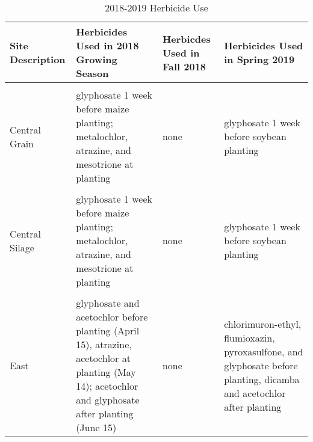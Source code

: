 \documentclass[
]{article}
\begin{document}
\newpage

\begin{table}[H]

\caption{\label{tab:herbtable}2018-2019 Herbicide Use}
\centering
\begin{tabular}[t]{>{\centering\arraybackslash}p{8em}>{\centering\arraybackslash}p{8em}>{\centering\arraybackslash}p{8em}>{\centering\arraybackslash}p{8em}}
\toprule
Site Description & Herbicides Used in 2018 Growing Season & Herbicdes Used in Fall 2018 & Herbicides Used in Spring 2019\\
\midrule
\cellcolor{gray!6}{Central Grain} & \cellcolor{gray!6}{glyphosate 1 week before soybean planting} & \cellcolor{gray!6}{none} & \cellcolor{gray!6}{glyphosate 1 week before maize planting; metalochlor, atrazine, and mesotrione at planting}\\
\cmidrule{1-4}
Central Grain & glyphosate 1 week before maize planting; metalochlor, atrazine, and mesotrione at planting & none & glyphosate 1 week before soybean planting\\
\cmidrule{1-4}
\cellcolor{gray!6}{Central Silage} & \cellcolor{gray!6}{glyphosate 1 week before soybean planting} & \cellcolor{gray!6}{none} & \cellcolor{gray!6}{glyphosate 1 week before maize planting; metalochlor, atrazine, and mesotrione at planting}\\
\cmidrule{1-4}
Central Silage & glyphosate 1 week before maize planting; metalochlor, atrazine, and mesotrione at planting & none & glyphosate 1 week before soybean planting\\
\cmidrule{1-4}
\cellcolor{gray!6}{West} & \cellcolor{gray!6}{glyphosate before planting; glyphosate and fluthiacet-methyl at planting} & \cellcolor{gray!6}{none} & \cellcolor{gray!6}{glyphosate before planting; glyphosate and fluthiacet-methyl at planting}\\
\cmidrule{1-4}
East & glyphosate and acetochlor  before planting (April 15), atrazine, acetochlor at planting (May 14); acetochlor and glyphosate after planting (June 15) & none & chlorimuron-ethyl, flumioxazin, pyroxasulfone, and glyphosate before planting, dicamba and acetochlor after planting\\
\bottomrule
\end{tabular}
\end{table}

\newpage
\end{document}

